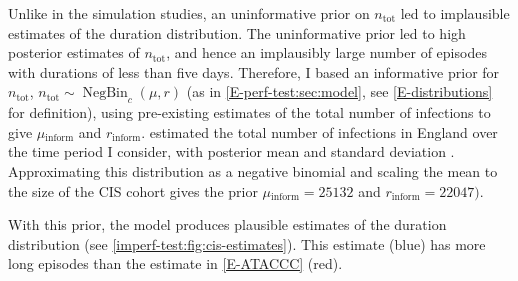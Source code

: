 \documentclass[12pt, letterpaper]{article} %
\DeclareMathOperator{\NBr}{NegBin}
\newcommand{\NBc}{\NBr_{c}}
\newcommand{\ntot}{n_\text{tot}}
\newcommand{\inform}{{_{\text{inform}}}}
\begin{document}
Unlike in the simulation studies, an uninformative prior on $\ntot$ led to implausible estimates of the duration distribution.
The uninformative prior led to high posterior estimates of $\ntot$, and hence an implausibly large number of episodes with durations of less than five days.
Therefore, I based an informative prior for $\ntot$, $\ntot \sim \NBc(\mu, r)$ (as in \cref{E-perf-test:sec:model}, see \cref{E-distributions} for definition), using pre-existing estimates of the total number of infections to give $\mu\inform$ and $r\inform$.
\Textcite{birrellRTM2} estimated the total number of infections in England over the time period I consider, with posterior mean  and standard deviation .
Approximating this distribution as a negative binomial and scaling the mean to the size of the CIS cohort gives the prior $\mu\inform = 25132$ and $r\inform = 22047)$.

With this prior, the model produces plausible estimates of the duration distribution (see \cref{imperf-test:fig:cis-estimates}).
This estimate (blue) has more long episodes than the estimate in \cref{E-ATACCC} (red).
\end{document}
